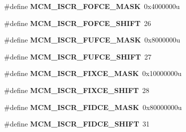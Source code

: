 \begin{DoxyCompactItemize}
\item 
\hypertarget{group___m_c_m___register___masks_ga7c59e8eefce78e605951ecf8c9da1f00}{}\#define {\bfseries M\+C\+M\+\_\+\+I\+S\+C\+R\+\_\+\+F\+O\+F\+C\+E\+\_\+\+M\+A\+S\+K}~0x4000000u\label{group___m_c_m___register___masks_ga7c59e8eefce78e605951ecf8c9da1f00}

\item 
\hypertarget{group___m_c_m___register___masks_gab83f7a7d4986544ad6d5a3972d72ced3}{}\#define {\bfseries M\+C\+M\+\_\+\+I\+S\+C\+R\+\_\+\+F\+O\+F\+C\+E\+\_\+\+S\+H\+I\+F\+T}~26\label{group___m_c_m___register___masks_gab83f7a7d4986544ad6d5a3972d72ced3}

\item 
\hypertarget{group___m_c_m___register___masks_ga9fa9ddc6391e5958245ccd332ebcd575}{}\#define {\bfseries M\+C\+M\+\_\+\+I\+S\+C\+R\+\_\+\+F\+U\+F\+C\+E\+\_\+\+M\+A\+S\+K}~0x8000000u\label{group___m_c_m___register___masks_ga9fa9ddc6391e5958245ccd332ebcd575}

\item 
\hypertarget{group___m_c_m___register___masks_gaeeab14ab4de1fa7d2d9a5d2492730e74}{}\#define {\bfseries M\+C\+M\+\_\+\+I\+S\+C\+R\+\_\+\+F\+U\+F\+C\+E\+\_\+\+S\+H\+I\+F\+T}~27\label{group___m_c_m___register___masks_gaeeab14ab4de1fa7d2d9a5d2492730e74}

\item 
\hypertarget{group___m_c_m___register___masks_gad92657cd1980c03f0d15615a3c9f2989}{}\#define {\bfseries M\+C\+M\+\_\+\+I\+S\+C\+R\+\_\+\+F\+I\+X\+C\+E\+\_\+\+M\+A\+S\+K}~0x10000000u\label{group___m_c_m___register___masks_gad92657cd1980c03f0d15615a3c9f2989}

\item 
\hypertarget{group___m_c_m___register___masks_gab9757207c9768c3f13461873bcb78d71}{}\#define {\bfseries M\+C\+M\+\_\+\+I\+S\+C\+R\+\_\+\+F\+I\+X\+C\+E\+\_\+\+S\+H\+I\+F\+T}~28\label{group___m_c_m___register___masks_gab9757207c9768c3f13461873bcb78d71}

\item 
\hypertarget{group___m_c_m___register___masks_ga0dc0741a93b687a65f28c5a1e109ba6e}{}\#define {\bfseries M\+C\+M\+\_\+\+I\+S\+C\+R\+\_\+\+F\+I\+D\+C\+E\+\_\+\+M\+A\+S\+K}~0x80000000u\label{group___m_c_m___register___masks_ga0dc0741a93b687a65f28c5a1e109ba6e}

\item 
\hypertarget{group___m_c_m___register___masks_ga19c565ce09db7c0d22bf65f93d9aabfc}{}\#define {\bfseries M\+C\+M\+\_\+\+I\+S\+C\+R\+\_\+\+F\+I\+D\+C\+E\+\_\+\+S\+H\+I\+F\+T}~31\label{group___m_c_m___register___masks_ga19c565ce09db7c0d22bf65f93d9aabfc}


\end{DoxyCompactItemize}
